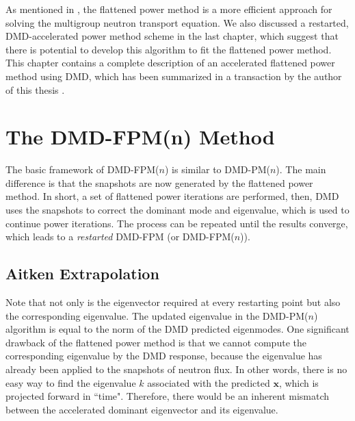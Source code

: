 As mentioned in , the flattened power method is a more efficient approach for solving the multigroup neutron transport equation.
We also discussed a restarted, DMD-accelerated power method scheme in the last chapter, which suggest that there is potential to develop this algorithm to fit the flattened power method.
This chapter contains a complete description of an accelerated flattened power method using DMD, which has been summarized in a transaction by the author of this thesis \cite{xu_acceleration}. 

\section{The DMD-FPM(n) Method}
The basic framework of DMD-FPM($n$) is similar to DMD-PM($n$). The main difference is that the snapshots are now generated by the flattened power method.
In short, a set of flattened power iterations are performed, then, DMD uses the snapshots to correct the dominant mode and eigenvalue, which is used to continue power iterations.
The process can be repeated until the results converge, which leads to a {\it restarted} DMD-FPM (or DMD-FPM($n$)).

\subsection{Aitken Extrapolation}
Note that not only is the eigenvector required at every restarting point but also the corresponding eigenvalue.
The updated eigenvalue in the DMD-PM($n$) algorithm is equal to the norm of the DMD predicted eigenmodes. 
One significant drawback of the flattened power method is that we cannot compute the corresponding eigenvalue by the DMD response, because the eigenvalue has already been applied to the snapshots of neutron flux.
In other words, there is no easy way to find the eigenvalue $k$ associated with the predicted $\mathbf{x}$, which is projected forward in ``time".
Therefore, there would be an inherent mismatch between the accelerated dominant eigenvector and its eigenvalue.

